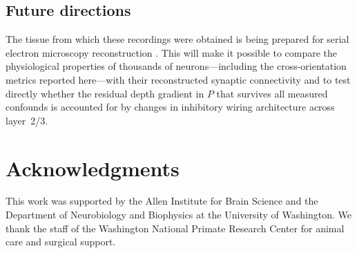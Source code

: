 \documentclass[11pt,letterpaper]{article}
\begin{document}
\subsection{Future directions}

The tissue from which these recordings were obtained is being prepared for
serial electron microscopy reconstruction \citep{chatterjee2021}. This will
make it possible to compare the physiological properties of thousands of
neurons---including the cross-orientation metrics reported here---with their
reconstructed synaptic connectivity and to test directly whether the residual
depth gradient in $P$ that survives all measured confounds is accounted for by
changes in inhibitory wiring architecture across layer~2/3.

\section*{Acknowledgments}

This work was supported by the Allen Institute for Brain Science and the
Department of Neurobiology and Biophysics at the University of Washington.
We thank the staff of the Washington National Primate Research Center for
animal care and surgical support.


\end{document}
